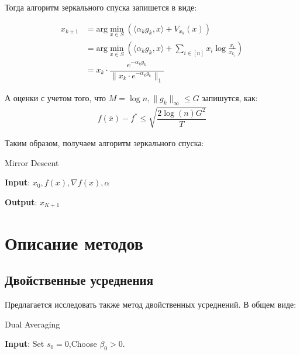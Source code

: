\documentclass[a4paper,12pt]{article}
\theoremstyle{plain} %
\theoremstyle{definition} %
\theoremstyle{remark} %
\theoremstyle{definition}
\theoremstyle{definition}
\let\leq\leqslant
\begin{document}
Тогда алгоритм зеркального спуска запишется в виде:

\begin{align*}
x_{k+1} &= \text{arg}\min\limits_{x \in S} \left( \langle \alpha_k g_k, x \rangle + V_{x_k}(x) \right) \\
&= \text{arg}\min\limits_{x \in S} \left( \langle \alpha_k g_k, x \rangle + \sum_{i \in [n]} x_i \log \frac{x_i}{x_{k_i}} \right) \\
&= x_k \cdot \dfrac{e^{-\alpha_k g_k}}{\|x_k \cdot e^{-\alpha_k g_k}\|_1}
\end{align*}

А оценки с учетом того, что $M = \log n, \|g_k\|_\infty \leq G$ запишутся, как:
\begin{align*}
f(\overline{x}) - f^*  \leq \sqrt{\dfrac{2 \log (n) G^2}{T}}
\end{align*}
	
Таким образом, получаем алгоритм зеркального спуска:
	
	\begin{algorithm}[h!]
		\caption{Mirror Descent}
		\hspace*{\algorithmicindent} \textbf{Input}: $x_0, f(x), \nabla f(x), \alpha$
		\begin{algorithmic}[1]
			\ENDFOR
		\end{algorithmic}
		\textbf{Output}: ${x}_{K+1}$
	\end{algorithm}
	
	
	\newpage	
	\section{Описание методов}
	\subsection{Двойственные усреднения}
	Предлагается исследовать также метод двойственных усреднений. В общем виде:
	
	\begin{algorithm}[h!]
		\caption{Dual Averaging}
		\textbf{Input}: Set $s_0=0$,Choose $\beta_0>0$.
		\begin{algorithmic}[1]
			\ENDFOR
		\end{algorithmic}
	\end{algorithm}
	
\end{document}
